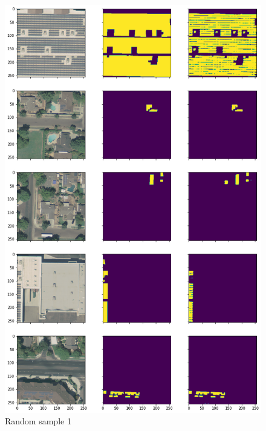 \documentclass[a4paper, 12pt]{article}
\begin{document}
	\begin{figure}[H]
	    \centering
	    \includegraphics[height=0.92\textheight]{resources/png/representative_0.png}
	    \caption{Random sample 1}
	\end{figure}
	
\end{document}
